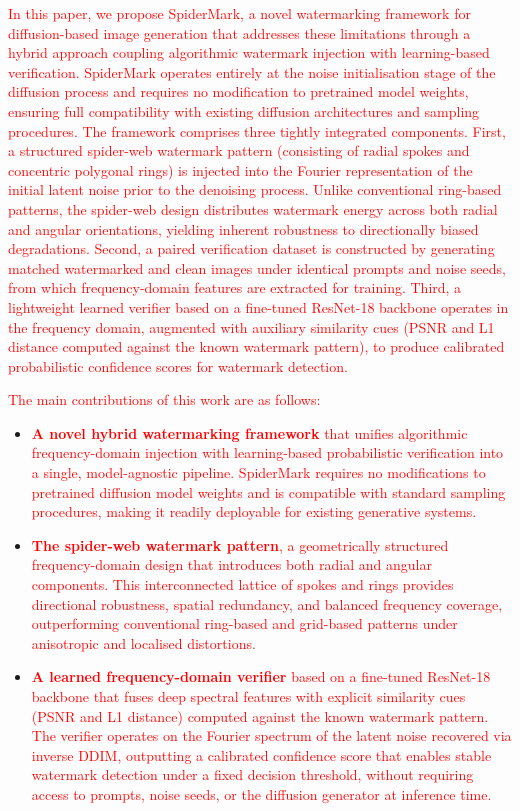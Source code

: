 \textcolor{red}{
In this paper, we propose SpiderMark, a novel watermarking framework for diffusion-based image generation that addresses these limitations through a hybrid approach coupling algorithmic watermark injection with learning-based verification. SpiderMark operates entirely at the noise initialisation stage of the diffusion process and requires no modification to pretrained model weights, ensuring full compatibility with existing diffusion architectures and sampling procedures. The framework comprises three tightly integrated components. First, a structured spider-web watermark pattern (consisting of radial spokes and concentric polygonal rings) is injected into the Fourier representation of the initial latent noise prior to the denoising process. Unlike conventional ring-based patterns, the spider-web design distributes watermark energy across both radial and angular orientations, yielding inherent robustness to directionally biased degradations. Second, a paired verification dataset is constructed by generating matched watermarked and clean images under identical prompts and noise seeds, from which frequency-domain features are extracted for training. Third, a lightweight learned verifier based on a fine-tuned ResNet-18 backbone operates in the frequency domain, augmented with auxiliary similarity cues (PSNR and L1 distance computed against the known watermark pattern), to produce calibrated probabilistic confidence scores for watermark detection.}

\textcolor{red}{
The main contributions of this work are as follows:}

\begin{itemize}
    \item \textcolor{red}{\textbf{A novel hybrid watermarking framework} that unifies algorithmic frequency-domain injection with learning-based probabilistic verification into a single, model-agnostic pipeline. SpiderMark requires no modifications to pretrained diffusion model weights and is compatible with standard sampling procedures, making it readily deployable for existing generative systems.}

    \item \textcolor{red}{\textbf{The spider-web watermark pattern}, a geometrically structured frequency-domain design that introduces both radial and angular components. This interconnected lattice of spokes and rings provides directional robustness, spatial redundancy, and balanced frequency coverage, outperforming conventional ring-based and grid-based patterns under anisotropic and localised distortions.}

    \item \textcolor{red}{\textbf{A learned frequency-domain verifier} based on a fine-tuned ResNet-18 backbone that fuses deep spectral features with explicit similarity cues (PSNR and L1 distance) computed against the known watermark pattern. The verifier operates on the Fourier spectrum of the latent noise recovered via inverse DDIM, outputting a calibrated confidence score that enables stable watermark detection under a fixed decision threshold, without requiring access to prompts, noise seeds, or the diffusion generator at inference time.}
\end{itemize}

